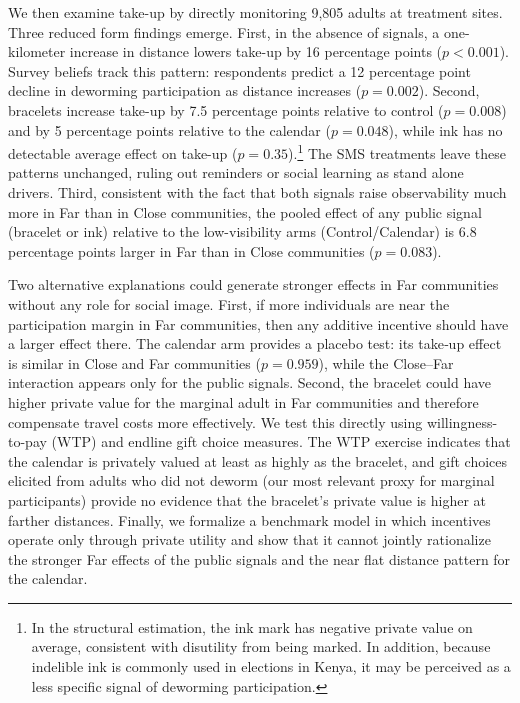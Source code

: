 \documentclass[12pt,a4paper]{article}
\begin{document}
We then examine take-up by directly monitoring 9{,}805 adults at treatment sites. Three reduced form findings emerge. First, in the absence of signals, a one-kilometer increase in distance lowers take-up by 16 percentage points (\(p<0.001\)). Survey beliefs track this pattern: respondents predict a 12 percentage point decline in deworming participation as distance increases ($p=0.002$). Second, bracelets increase take-up by 7.5 percentage points relative to control (\(p=0.008\)) and by 5 percentage points relative to the calendar (\(p=0.048\)), while ink has no detectable average effect on take-up (\(p=0.35\)).\footnote{In the structural estimation, the ink mark has negative private value on average, consistent with disutility from being marked. In addition, because indelible ink is commonly used in elections in Kenya, it may be perceived as a less specific signal of deworming participation.} The SMS treatments leave these patterns unchanged, ruling out reminders or social learning as stand alone drivers. Third, consistent with the fact that both signals raise observability much more in Far than in Close communities, the pooled effect of any public signal (bracelet or ink) relative to the low-visibility arms (Control/Calendar) is 6.8 percentage points larger in Far than in Close communities (\(p=0.083\)).

Two alternative explanations could generate stronger effects in Far communities without any role for social image. First, if more individuals are near the participation margin in Far communities, then any additive incentive should have a larger effect there. The calendar arm provides a placebo test: its take‑up effect is similar in Close and Far communities ($p = 0.959$), while the Close–Far interaction appears only for the public signals. Second, the bracelet could have higher private value for the marginal adult in Far communities and therefore compensate travel costs more effectively. We test this directly using willingness-to-pay (WTP) and endline gift choice measures. The WTP exercise indicates that the calendar is privately valued at least as highly as the bracelet, and gift choices elicited from adults who did not deworm (our most relevant proxy for marginal participants) provide no evidence that the bracelet’s private value is higher at farther distances. Finally, we formalize a benchmark model in which incentives operate only through private utility and show that it cannot jointly rationalize the stronger Far effects of the public signals and the near flat distance pattern for the calendar.
\end{document}
